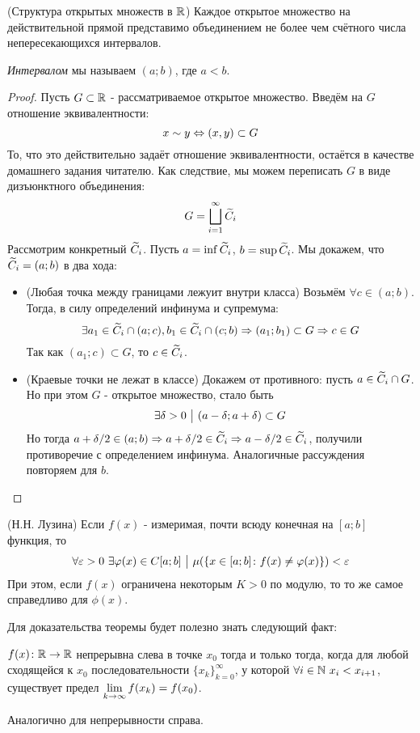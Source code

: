 \begin{theorem} (Структура открытых множеств в $\mathbb{R}$)
	Каждое открытое множество на действительной прямой представимо объединением не более чем счётного числа непересекающихся интервалов.
\end{theorem}

\begin{reminder}
	\textit{Интервалом} мы называем $(a; b)$, где $a < b$.
\end{reminder}

\begin{proof}
	Пусть $G \subset \mathbb{R}$ - рассматриваемое открытое множество. Введём на $G$ отношение эквивалентности:
	\[
		x \sim y \Leftrightarrow (x, y) \subset G
	\]
	То, что это действительно задаёт отношение эквивалентности, остаётся в качестве домашнего задания читателю. Как следствие, мы можем переписать $G$ в виде дизъюнктного объединения:
	\[
		G = \bigsqcup_{i = 1}^\infty \widetilde{C}_i
	\]
	Рассмотрим конкретный $\widetilde{C}_i$. Пусть $a = \inf \widetilde{C}_i$, $b = \sup \widetilde{C}_i$. Мы докажем, что $\widetilde{C}_i = (a; b)$ в два хода:
	\begin{itemize}
		\item (Любая точка между границами лежуит внутри класса) Возьмём $\forall c \in (a; b)$. Тогда, в силу определений инфинума и супремума:
		\[
			\exists a_1 \in \widetilde{C}_i \cap (a; c), b_1 \in \widetilde{C}_i \cap (c; b) \Rightarrow (a_1; b_1) \subset G \Rightarrow c \in G
		\]
		Так как $(a_1; c) \subset G$, то $c \in \widetilde{C}_i$.
		
		\item (Краевые точки не лежат в классе) Докажем от противного: пусть $a \in \widetilde{C}_i \cap G$. Но при этом $G$ - открытое множество, стало быть
		\[
			\exists \delta > 0 \ \big|\  (a - \delta; a + \delta) \subset G
		\]
		Но тогда $a + \delta / 2 \in (a; b) \Rightarrow a + \delta / 2 \in \widetilde{C}_i \Rightarrow a - \delta / 2 \in \widetilde{C}_i$, получили противоречие с определением инфинума. Аналогичные рассуждения повторяем для $b$.
	\end{itemize}
\end{proof}

\begin{theorem} (Н.Н. Лузина)
	Если $f(x)$ - измеримая, почти всюду конечная на $[a; b]$ функция, то
	\[
		\forall \varepsilon > 0\ \exists \varphi(x) \in C[a; b] \ \big|\  \mu(\{x \in [a; b] \colon f(x) \neq \varphi(x)\}) < \varepsilon
	\]
	При этом, если $f(x)$ ограничена некоторым $K > 0$ по модулю, то то же самое справедливо для $\phi(x)$.
\end{theorem}

\begin{exercise}
	Для доказательства теоремы будет полезно знать следующий факт:
	
	$f(x) \colon \mathbb{R} \to \mathbb{R}$ непрерывна слева в точке $x_0$ тогда и только тогда, когда для любой сходящейся к $x_0$ последовательности $\{x_k\}_{k = 0}^\infty$, у которой $\forall i \in \mathbb{N}\ x_i < x_{i + 1}$, существует предел $\lim\limits_{k \to \infty} f(x_k) = f(x_0)$.
	
	Аналогично для непрерывности справа.
\end{exercise}

